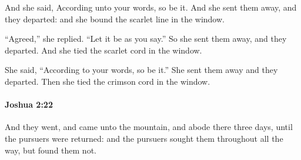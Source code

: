 			\begin{versebox}
					\item[BHS] 
					\item[ASV] And she said, According unto your words, so be it. And she sent them away, and they departed: and she bound the scarlet line in the window.
					\item[NIV] “Agreed,” she replied. “Let it be as you say.” So she sent them away, and they departed. And she tied the scarlet cord in the window.
					\item[NRSV] She said, “According to your words, so be it.” She sent them away and they departed. Then she tied the crimson cord in the window.
			\end{versebox}

		\paragraph{Joshua 2:22} %
			\label{JOSHUA-2-22}

			And they went, and came unto the mountain, and abode there three days, until the pursuers were returned: and the pursuers sought them throughout all the way, but found them not.

